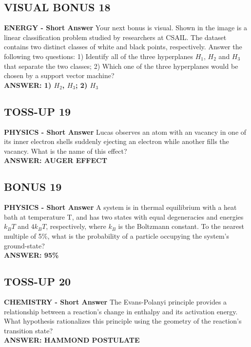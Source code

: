 \documentclass{article}
\begin{document}
\subsection*{VISUAL BONUS 18}
\textbf{ENERGY - Short Answer} Your next bonus is visual. Shown in the image is a linear classification problem studied by researchers at CSAIL. The dataset contains two distinct classes of white and black points, respectively. Answer the following two questions:
1) Identify all of the three hyperplanes $H_{1}$, $H_{2}$ and $H_{3}$ that separate the two classes;
2) Which one of the three hyperplanes would be chosen by a support vector machine? \\
\textbf{ANSWER: 1) $H_{2}$, $H_{3}$; 2) $H_{3}$}

\subsection*{TOSS-UP 19}
\textbf{PHYSICS - Short Answer} Lucas observes an atom with an vacancy in one of its inner electron shells suddenly ejecting an electron while another fills the vacancy. What is the name of this effect? \\
\textbf{ANSWER: AUGER EFFECT}

\subsection*{BONUS 19}
\textbf{PHYSICS - Short Answer} A system is in thermal equilibrium with a heat bath at temperature T, and has two states with equal degeneracies and energies $k_{B}T$ and $4k_{B}T$, respectively, where $k_{B}$ is the Boltzmann constant. To the nearest multiple of 5\%, what is the probability of a particle occupying the system's ground-state? \\
\textbf{ANSWER: 95\%}

\subsection*{TOSS-UP 20}
\textbf{CHEMISTRY - Short Answer} The Evans-Polanyi principle provides a relationship between a reaction's change in enthalpy and its activation energy. What hypothesis rationalizes this principle using the geometry of the reaction's transition state? \\
\textbf{ANSWER: HAMMOND POSTULATE}
\end{document}
